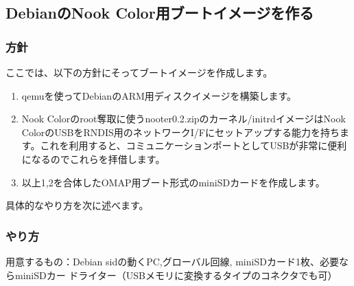 \documentclass[mingoth,a4paper]{jsarticle}
\begin{document}
\subsection{DebianのNook Color用ブートイメージを作る}

\subsubsection{方針}

 ここでは、以下の方針にそってブートイメージを作成します。

\begin{enumerate}
\item qemuを使ってDebianのARM用ディスクイメージを構築します。
\item Nook Colorのroot奪取に使うnooter0.2.zipのカーネル/initrdイメージはNook ColorのUSBをRNDIS用のネットワークI/Fにセットアップする能力を持ちます。これを利用すると、コミュニケーションポートとしてUSBが非常に便利になるのでこれらを拝借します。
\item 以上1,2を合体したOMAP用ブート形式のminiSDカードを作成します。
\end{enumerate}

具体的なやり方を次に述べます。

\subsubsection{やり方}

用意するもの：Debian sidの動くPC,グローバル回線, miniSDカード1枚、必要ならminiSDカー
ドライター（USBメモリに変換するタイプのコネクタでも可）
\end{document}

